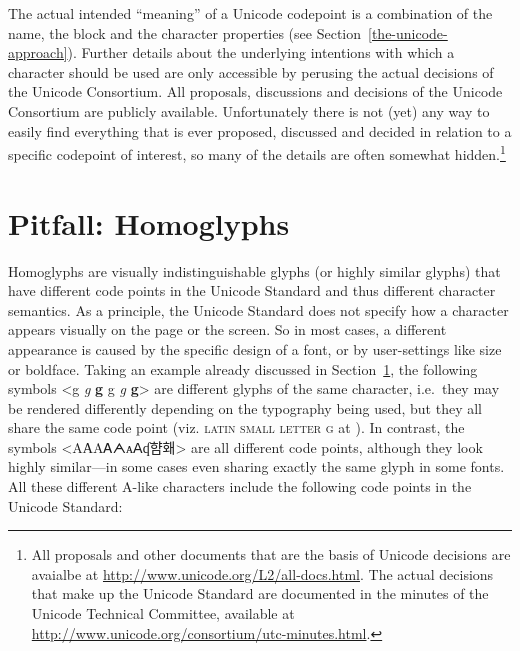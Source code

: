 The actual intended ``meaning'' of a Unicode codepoint is a combination of the
name, the block and the character properties (see
Section~\ref{the-unicode-approach}). Further details about the underlying intentions 
with which a character should be used
are only accessible by perusing the actual decisions of the Unicode Consortium.
All proposals, discussions and decisions of the Unicode Consortium are publicly
available. Unfortunately there is not (yet) any way to easily find everything
that is ever proposed, discussed and decided in relation to a specific
codepoint of interest, so many of the details are often somewhat
hidden.\footnote{All proposals and other documents that are the basis of Unicode
decisions are avaialbe at \url{http://www.unicode.org/L2/all-docs.html}. The
actual decisions that make up the Unicode Standard are documented in the minutes
of the Unicode Technical Committee, available at
\url{http://www.unicode.org/consortium/utc-minutes.html}.}

\section{Pitfall: Homoglyphs}
\label{pitfall-homoglyphs}

Homoglyphs are visually indistinguishable glyphs (or highly similar glyphs) that
have different code points in the Unicode Standard and thus different character
semantics. As a principle, the Unicode Standard does not specify how a character
appears visually on the page or the screen. So in most cases, a different
appearance is caused by the specific design of a font, or by user-settings like
size or boldface. Taking an example already discussed in
Section~\ref{pitfall-homoglyphs}, the following symbols <g {\large \textit{g}}
\textbf{g} { {\small g} \textit{g} \textbf{g}}> are different
glyphs of the same character, i.e.~they may be rendered differently depending on
the typography being used, but they all share the same code point (viz.
\textsc{latin small letter g} at ). In contrast, the symbols
<{AАΑᎪᗅᴀꓮʠ햠홰}> are all different code points,
although they look highly similar---in some cases even sharing exactly the same
glyph in some fonts. All these different A-like characters include the following
code points in the Unicode Standard:


